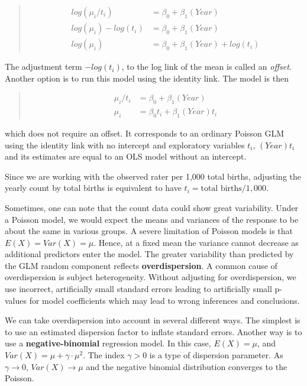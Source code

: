 \documentclass[
]{krantz}
\begin{document}
\begin{quote}
\[
\begin{aligned}
log\left(\mu_{i}/t_{i}\right) &= \beta_{0} + \beta_{1}(Year)  \\
log\left(\mu_{i}\right) - log\left(t_{i}\right) &= \beta_{0} + \beta_{1}(Year)  \\
log\left(\mu_{i}\right) &= \beta_{0} + \beta_{1}(Year) + log\left(t_{i}\right)
\end{aligned}
\]
\end{quote}

The adjustment term \(-log\left(t_{i}\right)\), to the log link of the mean is called an \emph{offset}. Another option is to run this model using the identity link. The model is then

\begin{quote}
\[
\begin{aligned}
\mu_{i}/t_{i} &= \beta_{0} + \beta_{1}(Year)  \\
\mu_{i} &= \beta_{0}t_{i} + \beta_{1}(Year)t_{i}
\end{aligned}
\]
\end{quote}

which does not require an offset. It corresponds to an ordinary Poisson GLM using the identity link with no intercept and exploratory variables \(t_{i}\), \((Year)t_{i}\) and its estimates are equal to an OLS model without an intercept.

Since we are working with the observed rater per 1,000 total births, adjusting the yearly count by total births is equivalent to have \(t_{i} = \text{total births}/1,000\).

Sometimes, one can note that the count data could show great variability. Under a Poisson model, we would expect the means and variances of the response to be about the same in various groups. A severe limitation of Poisson models is that \(E \left(X \right) = Var \left(X \right) = \mu\). Hence, at a fixed mean the variance cannot decrease as additional predictors enter the model. The greater variability than predicted by the GLM random component reflects \textbf{overdispersion}. A common cause of overdispersion is subject heterogeneity. Without adjusting for overdispersion, we use incorrect, artificially small standard errors leading to artificially small p-values for model coefficients which may lead to wrong inferences and conclusions.

We can take overdispersion into account in several different ways. The simplest is to use an estimated dispersion factor to inflate standard errors. Another way is to use a \textbf{negative-binomial} regression model. In this case, \(E\left(X\right)= \mu\), and \(Var \left( X \right) = \mu + \gamma \cdot \mu^{2}\). The index \(\gamma > 0\) is a type of dispersion parameter. As \(\gamma \rightarrow 0\), \(Var \left( X \right) \rightarrow \mu\) and the negative binomial distribution converges to the Poisson.
\end{document}
